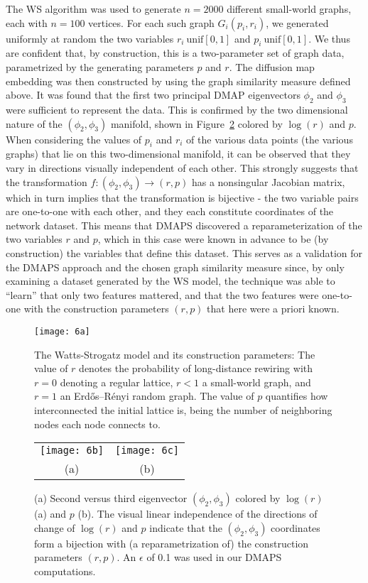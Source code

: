 The WS algorithm was used to generate $n=2000$ different small-world
graphs, each with $n=100$ vertices. For each such graph
$G_i(p_i, r_i)$, we generated uniformly at random the two variables
$r_i ~ \mathrm{unif}[0,1]$ and $p_i ~ \mathrm{unif}[0,1]$. We thus are
confident that, by construction, this is a two-parameter set of graph
data, parametrized by the generating parameters $p$ and $r$. The
diffusion map embedding was then constructed by using the graph
similarity measure defined above. It was found that the first two
principal DMAP eigenvectors $\phi_2$ and $\phi_3$ were sufficient to
represent the data. This is confirmed by the two dimensional nature of
the $(\phi_2, \phi_3)$ manifold, shown in Figure~\ref{fig:sis6bc}
colored by $\log(r)$ and $p$. When considering the values of $p_i$ and
$r_i$ of the various data points (the various graphs) that lie on this
two-dimensional manifold, it can be observed that they vary in
directions visually independent of each other. This strongly suggests
that the transformation $f:(\phi_2, \phi_3) \rightarrow (r,p)$ has a
nonsingular Jacobian matrix, which in turn implies that the
transformation is bijective - the two variable pairs are one-to-one
with each other, and they each constitute coordinates of the network
dataset. This means that DMAPS discovered a reparameterization of the
two variables $r$ and $p$, which in this case were known in advance to
be (by construction) the variables that define this dataset. This
serves as a validation for the DMAPS approach and the chosen graph
similarity measure since, by only examining a dataset generated by the
WS model, the technique was able to “learn” that only two features
mattered, and that the two features were one-to-one with the
construction parameters $(r, p)$ that here were a priori known.


\begin{figure}[!htp]
\centering
\texttt{[image: 6a]}
\caption[Variations of Watts-Strogatz model]{The Watts-Strogatz model and its construction parameters:
  The value of $r$ denotes the probability of long-distance rewiring
  with $r = 0$ denoting a regular lattice, $r < 1$ a small-world graph,
  and $r = 1$ an Erdős–Rényi random graph. The value of $p$ quantifies how
  interconnected the initial lattice is, being the number of
  neighboring nodes each node connects to. \label{fig:sis6a}}
\end{figure}

\begin{figure}[!htp]
\centering
\begin{tabular}{cc}
  \texttt{[image: 6b]} &
  \texttt{[image: 6c]}\\
  (a) & (b)
\end{tabular}
\caption[DMAPS results on Watts-Strogatz networks]{(a) Second versus third eigenvector $(\phi_2 ,\phi_3)$
  colored by $\log(r)$ (a) and $p$ (b). The visual linear independence
  of the directions of change of $\log(r)$ and $p$ indicate that the
  $(\phi_2 ,\phi_3)$ coordinates form a bijection with (a
  reparametrization of) the construction parameters $(r, p)$. An
  $\epsilon$ of 0.1 was used in our DMAPS
  computations. \label{fig:sis6bc}}
\end{figure}


